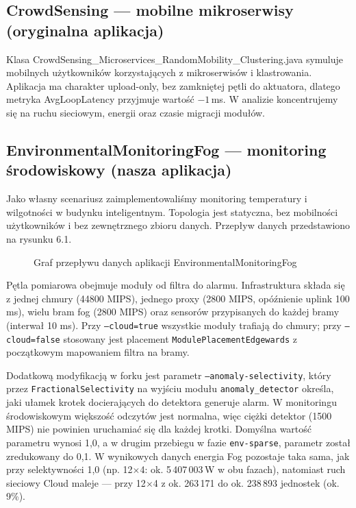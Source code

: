 \documentclass[
    oneside,            %
    left=2.5cm,         %
    right=2.5cm,        %
    top=2.5cm,          %
    bottom=3cm,         %
    bindingoffset=6mm,  %
    nohyphenation=false %
]{eiti/eiti-report}
\begin{document}
\subsection{CrowdSensing --- mobilne mikroserwisy (oryginalna aplikacja)}
Klasa CrowdSensing\_Microservices\_RandomMobility\_Clustering.java symuluje mobilnych użytkowników korzystających z mikroserwisów i klastrowania. Aplikacja ma charakter upload-only, bez zamkniętej pętli do aktuatora, dlatego metryka AvgLoopLatency przyjmuje wartość $-1$\,ms. W analizie koncentrujemy się na ruchu sieciowym, energii oraz czasie migracji modułów.

\subsection[Monitoring środowiskowy]{EnvironmentalMonitoringFog --- monitoring środowiskowy (nasza aplikacja)}
Jako własny scenariusz zaimplementowaliśmy monitoring temperatury i wilgotności w budynku inteligentnym. Topologia jest statyczna, bez mobilności użytkowników i bez zewnętrznego zbioru danych. Przepływ danych przedstawiono na rysunku 6.1.
\begin{figure}[htbp]
    \centering
    \footnotesize
    \setlength{\fboxsep}{4pt}
    \caption{Graf przepływu danych aplikacji EnvironmentalMonitoringFog}
\end{figure}
Pętla pomiarowa obejmuje moduły od filtra do alarmu. Infrastruktura składa się z jednej chmury (44800 MIPS), jednego proxy (2800 MIPS, opóźnienie uplink 100 ms), wielu bram fog (2800 MIPS) oraz sensorów przypisanych do każdej bramy (interwał 10 ms). Przy \texttt{--cloud=true} wszystkie moduły trafiają do chmury; przy \texttt{--cloud=false} stosowany jest placement \texttt{Module\-Placement\-Edgewards} z początkowym mapowaniem filtra na bramy.

Dodatkową modyfikacją w forku jest parametr \texttt{--anomaly-selectivity}, który przez \texttt{FractionalSelectivity} na wyjściu modułu \texttt{anomaly\_detector} określa, jaki ułamek krotek docierających do detektora generuje alarm. W monitoringu środowiskowym większość odczytów jest normalna, więc ciężki detektor (1500 MIPS) nie powinien uruchamiać się dla każdej krotki. Domyślna wartość parametru wynosi 1,0, a w drugim przebiegu w fazie \texttt{env-sparse}, parametr został zredukowany do 0,1. W wynikowych danych energia Fog pozostaje taka sama, jak przy selektywności 1,0 (np. 12$\times$4: ok. 5\,407\,003\,W w obu fazach), natomiast ruch sieciowy Cloud maleje --- przy 12$\times$4 z ok. 263\,171 do ok. 238\,893 jednostek (ok. 9\%).
\end{document}
